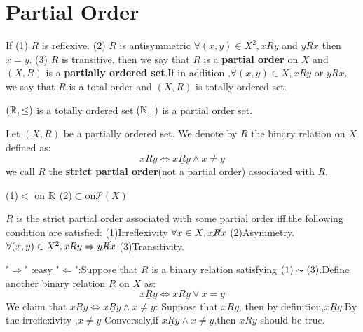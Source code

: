 \documentclass{book}
\begin{document}
\section{Partial Order}
\begin{definitionenv}
    If 
    \newline
    (1) $R$ is reflexive.
    \newline
    (2) $R$ is antisymmetric $\forall (x,y)\in X^2,xRy $ and $yRx$ then $x=y$.
    \newline
    (3) $R$ is transitive.
    \newline
    then we say that $R$ is a \textbf{partial order} on $X$ and $(X,R) $ is a \textbf{partially ordered set}.If in addition ,$\forall (x,y)\in X ,xRy$ or $yRx$, we say that $R$ is a total order and $(X,R)$ is totally ordered set. 
\end{definitionenv}
\begin{exampleenv}
    $(\mathbb{R} ,\le)$ is a totally ordered set.$(\mathbb{N} ,|)$ is a partial order set.  
\end{exampleenv}
\begin{definitionenv}
    Let $(X,\underline{R})$ be a partially ordered set. We denote by $R$ the binary relation on $X$ defined as:$$xRy \Leftrightarrow x\underline{R}y \wedge x\not=y$$ we call $R$ the \textbf{strict partial order}(not a partial order) associated with $\underline{R}$.
\end{definitionenv}
\begin{exampleenv}
    \quad
    \newline
    (1)$<$ on $\mathbb{R}$
    \newline
    (2)$\subset $on$ \mathcal{P} (X)$
\end{exampleenv}
\begin{propositionenv}
    $R$ is the strict partial order associated with some partial order iff.the following condition are satisfied:
    \newline
    (1)Irreflexivity $\forall x\in X,x \cancel{R}x$
    \newline
    (2)Asymmetry.$\forall (x,y)\in X^2,xRy\Rightarrow y\cancel{R}x$
    \newline
    (3)Transitivity.
\end{propositionenv}
\begin{proofenv}
    "$\Rightarrow$" :easy
    \newline
    "$\Leftarrow$":Suppose that $R$ is a binary relation satisfying $(1)\thicksim(3)$.Define another binary relation $\underline{R}$ on $X$ as:
    $$x\underline{R}y\Leftrightarrow xRy \vee x=y$$
    We claim that $xRy\Leftrightarrow x\underline{R}y \wedge x\not= y$:
    \newline
    Suppose that $xRy$, then by definition,$x\underline{R}y$.By the irreflexivity ,$x\not=y$
    \newline
    Conversely,if $x\underline{R}y\wedge x\not=y$,then $xRy$ should be true.
\end{proofenv}
\end{document}
